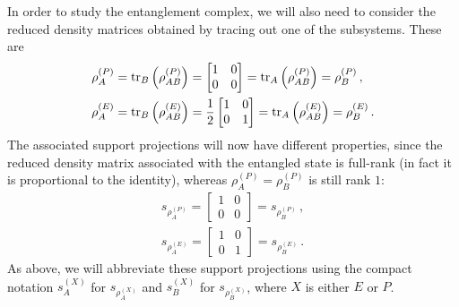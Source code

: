 \documentclass[12pt]{article}
\numberwithin{equation}{section}
\begin{document}
In order to study the entanglement complex, we will also need to consider the reduced density matrices obtained by tracing out one of the subsystems. These are
%
\begin{align}
    \rho_A^{(P)} &= \tr_B \left( \rho_{AB}^{(P)} \right) = \begin{bmatrix} 1 & 0 \\ 0 & 0 \end{bmatrix} = \tr_A \left( \rho_{AB}^{(P)} \right) = \rho_B^{(P)} \, , \nonumber \\
    \rho_A^{(E)} &= \tr_B \left( \rho_{AB}^{(E)} \right) = \frac{1}{2} \begin{bmatrix} 1 & 0 \\ 0 & 1 \end{bmatrix} = \tr_A \left( \rho_{AB}^{(E)} \right) = \rho_B^{(E)} \, .
\end{align}
%
The associated support projections will now have different properties, since the reduced density matrix associated with the entangled state is full-rank (in fact it is proportional to the identity), whereas $\rho_A^{(P)} = \rho_B^{(P)}$ is still rank $1$:
%
\begin{align}
    s_{\rho_A^{(P)}} = \begin{bmatrix} 1 & 0 \\ 0 & 0 \end{bmatrix} = s_{\rho_B^{(P)}} \, , \nonumber \\
    s_{\rho_A^{(E)}} = \begin{bmatrix} 1 & 0 \\ 0 & 1 \end{bmatrix} = s_{\rho_B^{(E)}} \, .
\end{align}
%
As above, we will abbreviate these support projections using the compact notation $s_A^{(X)}$ for $s_{\rho_A^{(X)}}$ and $s_B^{(X)}$ for $s_{\rho_B^{(X)}}$, where $X$ is either $E$ or $P$.
\end{document}
